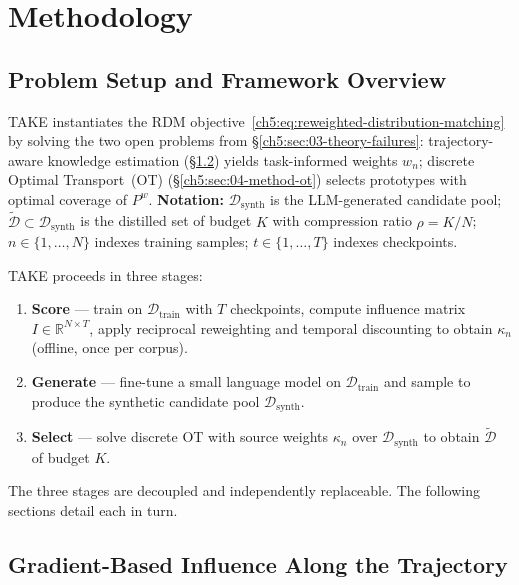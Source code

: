 \section{Methodology} \label{sec:54-research03-methodology}

\subsection{Problem Setup and Framework Overview} \label{ch5:sec:04-setup}

\begin{foldable} %
	TAKE instantiates the RDM objective~\eqref{ch5:eq:reweighted-distribution-matching} by solving the two open problems from \S\ref{ch5:sec:03-theory-failures}: trajectory-aware knowledge estimation (\S\ref{ch5:sec:04-method-gradient}) yields task-informed weights $w_n$; discrete Optimal Transport~(OT) (\S\ref{ch5:sec:04-method-ot}) selects prototypes with optimal coverage of $P^w$.
	\textbf{Notation:} $\mathcal{D}_\text{synth}$ is the LLM-generated candidate pool; $\tilde{\mathcal{D}} \subset \mathcal{D}_\text{synth}$ is the distilled set of budget $K$ with compression ratio $\rho = K/N$; $n \in \{1,\ldots,N\}$ indexes training samples; $t \in \{1,\ldots,T\}$ indexes checkpoints.
\end{foldable}

\begin{foldable} %
	TAKE proceeds in three stages:
	\begin{enumerate}
		\item \textbf{Score} --- train on $\mathcal{D}_\text{train}$ with $T$ checkpoints, compute influence matrix $I \in \mathbb{R}^{N \times T}$, apply reciprocal reweighting and temporal discounting to obtain $\kappa_n$ (offline, once per corpus).
		\item \textbf{Generate} --- fine-tune a small language model on $\mathcal{D}_\text{train}$ and sample to produce the synthetic candidate pool $\mathcal{D}_\text{synth}$.
		\item \textbf{Select} --- solve discrete OT with source weights $\kappa_n$ over $\mathcal{D}_\text{synth}$ to obtain $\tilde{\mathcal{D}}$ of budget $K$.
	\end{enumerate}
	The three stages are decoupled and independently replaceable. The following sections detail each in turn.
\end{foldable}


\subsection{Gradient-Based Influence Along the Trajectory} \label{ch5:sec:04-method-gradient}


